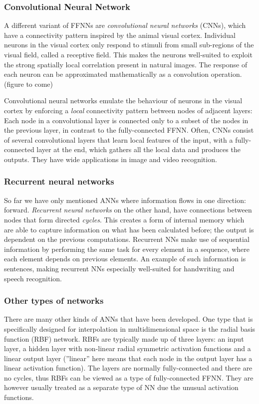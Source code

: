 \documentclass{beamer}
\begin{document}
\begin{frame}
\frametitle{Convolutional Neural Network}

A different variant of FFNNs are \emph{convolutional neural networks}
(CNNs), which have a connectivity pattern inspired by the animal
visual cortex. Individual neurons in the visual cortex only respond to
stimuli from small sub-regions of the visual field, called a receptive
field. This makes the neurons well-suited to exploit the strong
spatially local correlation present in natural images. The response of
each neuron can be approximated mathematically as a convolution
operation.  (figure to come)

Convolutional neural networks emulate the behaviour of neurons in the
visual cortex by enforcing a \emph{local} connectivity pattern between
nodes of adjacent layers: Each node in a convolutional layer is
connected only to a subset of the nodes in the previous layer, in
contrast to the fully-connected FFNN.  Often, CNNs consist of several
convolutional layers that learn local features of the input, with a
fully-connected layer at the end, which gathers all the local data and
produces the outputs. They have wide applications in image and video
recognition.
\end{frame}

\begin{frame}
\frametitle{Recurrent neural networks}

So far we have only mentioned ANNs where information flows in one
direction: forward. \emph{Recurrent neural networks} on the other hand,
have connections between nodes that form directed \emph{cycles}. This
creates a form of internal memory which are able to capture
information on what has been calculated before; the output is
dependent on the previous computations. Recurrent NNs make use of
sequential information by performing the same task for every element
in a sequence, where each element depends on previous elements. An
example of such information is sentences, making recurrent NNs
especially well-suited for handwriting and speech recognition.
\end{frame}

\begin{frame}
\frametitle{Other types of networks}

There are many other kinds of ANNs that have been developed. One type
that is specifically designed for interpolation in multidimensional
space is the radial basis function (RBF) network. RBFs are typically
made up of three layers: an input layer, a hidden layer with
non-linear radial symmetric activation functions and a linear output
layer (''linear'' here means that each node in the output layer has a
linear activation function). The layers are normally fully-connected
and there are no cycles, thus RBFs can be viewed as a type of
fully-connected FFNN. They are however usually treated as a separate
type of NN due the unusual activation functions.
\end{frame}
\end{document}
